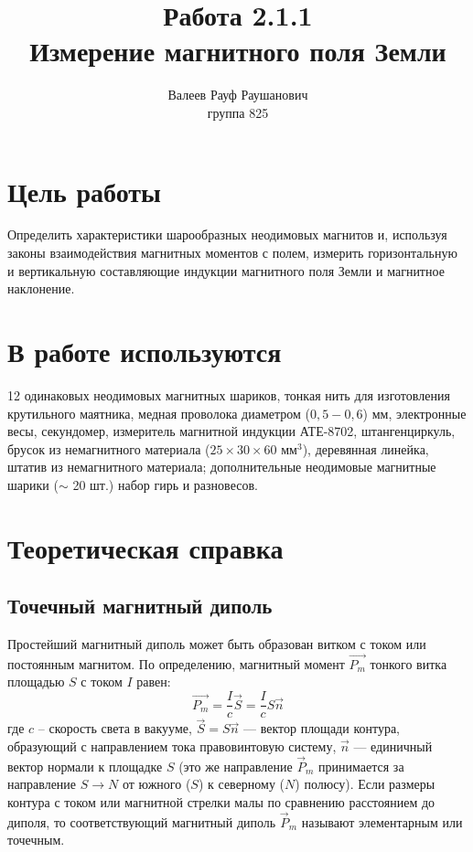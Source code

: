 \documentclass[a4paper, 12pt]{article}%
\author{Валеев Рауф Раушанович \\
группа 825}
\title{\textbf{Работа 2.1.1\\
Измерение магнитного поля Земли}}
\begin{document}
\maketitle
\newpage
\section*{Цель работы}
Определить характеристики шарообразных неодимовых магнитов и, используя законы взаимодействия магнитных моментов с полем, измерить горизонтальную и вертикальную составляющие индукции магнитного поля Земли и магнитное наклонение.
\section*{В работе используются}
12 одинаковых неодимовых магнитных шариков, тонкая нить для изготовления крутильного маятника, медная проволока диаметром ($0,5 - 0,6$) мм, электронные весы, секундомер, измеритель магнитной индукции АТЕ-8702, штангенциркуль, брусок из немагнитного материала ($25\times30\times60$ мм$^3$), деревянная линейка, штатив из немагнитного материала; дополнительные неодимовые магнитные шарики ($\sim$ 20 шт.) набор гирь и разновесов.
\section*{Теоретическая справка}
\subsection*{Точечный магнитный диполь}
Простейший магнитный диполь может быть образован витком с током или постоянным магнитом. По определению, магнитный момент $\vec{P_m}$ тонкого витка площадью $S$ с током $I$ равен:
\begin{equation*}
\vec{P_m} = \dfrac{I}{c}\vec{S} = \dfrac{I}{c} S \vec{n}
\end{equation*} 
где $c$ – скорость света в вакууме, $\vec{S} = S \vec{n}$ — вектор площади контура, образующий с направлением тока правовинтовую систему, $\vec{n}$ --- единичный вектор нормали к площадке $S$ (это же направление $\vec{P}_m$ принимается за направление $S \to N$ от южного ($S$) к северному ($N$) полюсу). Если размеры контура с током или магнитной стрелки малы по сравнению расстоянием до диполя, то соответствующий магнитный диполь $\vec{P}_m$ называют элементарным или точечным.
\end{document}
